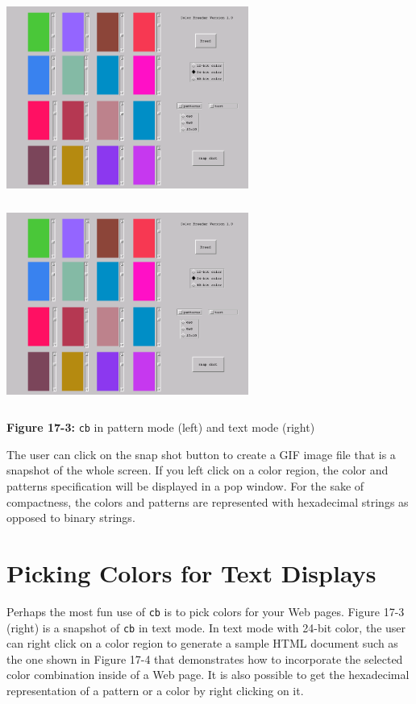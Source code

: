 \bigskip

\noindent \includegraphics[width=3.125in,height=2.62in]{ub-img/ub-img47.png}
\includegraphics[width=3.125in,height=2.62in]{ub-img/ub-img48.png}

{\sffamily\bfseries Figure 17-3:}
{\sffamily \texttt{cb} in pattern mode (left) and text mode (right)}

\bigskip


The user can click on the snap shot button to create a GIF image file
that is a snapshot of the whole screen. If you left click on a color
region, the color and patterns specification will be displayed in a pop
window. For the sake of compactness, the colors and patterns are
represented with hexadecimal strings as opposed to binary strings. 

\section{Picking Colors for Text Displays}

Perhaps the most fun use of \texttt{cb} is to pick colors for your Web
pages. Figure 17-3 (right) is a snapshot of \texttt{cb} in text mode.
In text mode with 24-bit color, the user can right click on a color
region to generate a sample HTML document such as the one shown in
Figure 17-4 that demonstrates how to incorporate the selected color
combination inside of a Web page. It is also possible to get the
hexadecimal representation of a pattern or a color by right clicking on
it.

